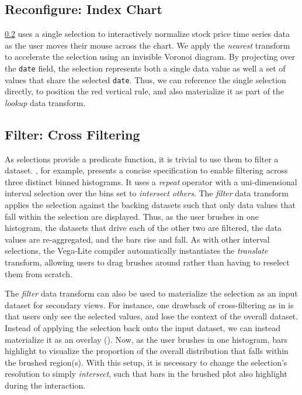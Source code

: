 \subsection{Reconfigure: Index Chart}

\cref{} uses a single selection to interactively normalize
stock price time series data as the user moves their mouse across the chart. We
apply the \emph{nearest} transform to accelerate the selection using an
invisible Voronoi diagram. By projecting over the \texttt{date} field, the
selection represents both a single data value as well a set of values that share
the selected \texttt{date}. Thus, we can reference the single selection
directly, to position the red vertical rule, and also materialize it as part of
the \emph{lookup} data transform.

\subsection{Filter: Cross Filtering}

As selections provide a predicate function, it is trivial to use them to filter
a dataset. , for example, presents a concise
specification to enable filtering across three distinct binned histograms. It
uses a \emph{repeat} operator with a uni-dimensional interval selection over the
bins set to \emph{intersect others}. The \emph{filter} data transform applies
the selection against the backing datasets such that only data values that fall
within the selection are displayed. Thus, as the user brushes in one histogram,
the datasets that drive each of the other two are filtered, the data values are
re-aggregated, and the bars rise and fall. As with other interval selections,
the Vega-Lite compiler automatically instantiates the \emph{translate}
transform, allowing users to drag brushes around rather than having to reselect
them from scratch.

The \emph{filter} data transform can also be used to materialize the selection
as an input dataset for secondary views. For instance, one drawback of
cross-filtering as in  is that users only see the
selected values, and lose the context of the overall dataset. Instead of
applying the selection back onto the input dataset, we can instead materialize
it as an overlay (). Now, as the user brushes in one
histogram, bars highlight to visualize the proportion of the overall
distribution that falls within the brushed region(s). With this setup, it is
necessary to change the selection's resolution to simply \emph{intersect}, such
that bars in the brushed plot also highlight during the interaction.